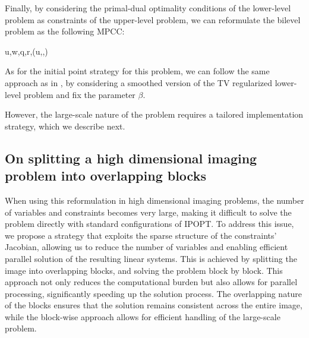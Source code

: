 \documentclass[review,onefignum,onetabnum]{siamonline190516}
\newcommand{\Jcal}{\mathcal{J}}
\newcommand{\Dcal}{\mathcal{D}}
\begin{document}
Finally, by considering the primal-dual optimality conditions of the lower-level problem as constraints of the upper-level problem, we can reformulate the bilevel problem as the following MPCC:
\begin{mini!}
  {u,w,q,r,\delta}{\Jcal(u,\alpha,\sigma)}{}{}
  \addConstraint{\nabla \Dcal(u)+\mathbb{K}^\ast q + \mathbb{E}^\ast \Lambda=0}{}
\end{mini!}

As for the initial point strategy for this problem, we can follow the same approach as in , by considering a smoothed version of the TV regularized lower-level problem and fix the parameter $\beta$.

However, the large-scale nature of the problem requires a tailored implementation strategy, which we describe next.




\subsection{On splitting a high dimensional imaging problem into overlapping blocks}
When using this reformulation in high dimensional imaging problems, the number of variables and constraints becomes very large, making it difficult to solve the problem directly with standard configurations of IPOPT. To address this issue, we propose a strategy that exploits the sparse structure of the constraints' Jacobian, allowing us to reduce the number of variables and enabling efficient parallel solution of the resulting linear systems. This is achieved by splitting the image into overlapping blocks, and solving the problem block by block. This approach not only reduces the computational burden but also allows for parallel processing, significantly speeding up the solution process. The overlapping nature of the blocks ensures that the solution remains consistent across the entire image, while the block-wise approach allows for efficient handling of the large-scale problem.
\end{document}
